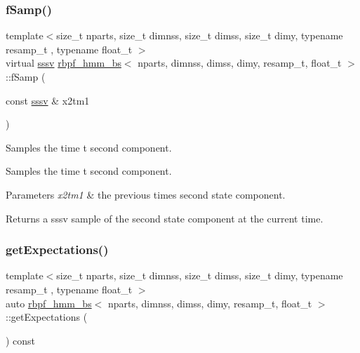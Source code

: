 \subsubsection{\texorpdfstring{f\+Samp()}{fSamp()}}
{\footnotesize\ttfamily template$<$size\+\_\+t nparts, size\+\_\+t dimnss, size\+\_\+t dimss, size\+\_\+t dimy, typename resamp\+\_\+t , typename float\+\_\+t $>$ \\
virtual \hyperlink{classrbpf__hmm__bs_a9a1c8d64f693a34a902dbfcb009d0f96}{sssv} \hyperlink{classrbpf__hmm__bs}{rbpf\+\_\+hmm\+\_\+bs}$<$ nparts, dimnss, dimss, dimy, resamp\+\_\+t, float\+\_\+t $>$\+::f\+Samp (\begin{DoxyParamCaption}\item[{const \hyperlink{classrbpf__hmm__bs_a9a1c8d64f693a34a902dbfcb009d0f96}{sssv} \&}]{x2tm1 }\end{DoxyParamCaption})\hspace{0.3cm}{\ttfamily [pure virtual]}}



Samples the time t second component. 

Samples the time t second component. 
\begin{DoxyParams}{Parameters}
{\em x2tm1} & the previous time\textquotesingle{}s second state component. \\
\hline
\end{DoxyParams}
\begin{DoxyReturn}{Returns}
a sssv sample of the second state component at the current time. 
\end{DoxyReturn}
\mbox{\label{classrbpf__hmm__bs_a1953395fb287449ba78cb5c324037ee5}} 
\subsubsection{\texorpdfstring{get\+Expectations()}{getExpectations()}}
{\footnotesize\ttfamily template$<$size\+\_\+t nparts, size\+\_\+t dimnss, size\+\_\+t dimss, size\+\_\+t dimy, typename resamp\+\_\+t , typename float\+\_\+t $>$ \\
auto \hyperlink{classrbpf__hmm__bs}{rbpf\+\_\+hmm\+\_\+bs}$<$ nparts, dimnss, dimss, dimy, resamp\+\_\+t, float\+\_\+t $>$\+::get\+Expectations (\begin{DoxyParamCaption}{ }\end{DoxyParamCaption}) const}



